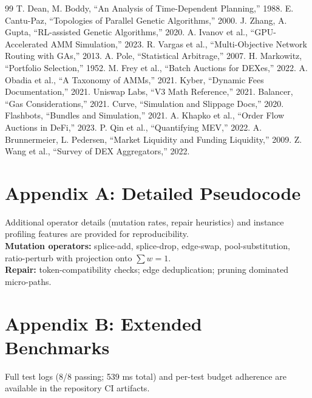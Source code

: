 \documentclass[11pt]{article}
\newcommand{\1}{\mathbf{1}}  %
\begin{document}
\begin{thebibliography}{99}
 T. Dean, M. Boddy, ``An Analysis of Time-Dependent Planning,'' 1988.
 E. Cantu-Paz, ``Topologies of Parallel Genetic Algorithms,'' 2000.
 J. Zhang, A. Gupta, ``RL-assisted Genetic Algorithms,'' 2020.
 A. Ivanov et al., ``GPU-Accelerated AMM Simulation,'' 2023.
 R. Vargas et al., ``Multi-Objective Network Routing with GAs,'' 2013.
 A. Pole, ``Statistical Arbitrage,'' 2007.
 H. Markowitz, ``Portfolio Selection,'' 1952.
 M. Frey et al., ``Batch Auctions for DEXes,'' 2022.
 A. Obadia et al., ``A Taxonomy of AMMs,'' 2021.
 Kyber, ``Dynamic Fees Documentation,'' 2021.
 Uniswap Labs, ``V3 Math Reference,'' 2021.
 Balancer, ``Gas Considerations,'' 2021.
 Curve, ``Simulation and Slippage Docs,'' 2020.
 Flashbots, ``Bundles and Simulation,'' 2021.
 A. Khapko et al., ``Order Flow Auctions in DeFi,'' 2023.
 P. Qin et al., ``Quantifying MEV,'' 2022.
 A. Brunnermeier, L. Pedersen, ``Market Liquidity and Funding Liquidity,'' 2009.
 Z. Wang et al., ``Survey of DEX Aggregators,'' 2022.
\end{thebibliography}

\appendix
\section*{Appendix A: Detailed Pseudocode}
\noindent Additional operator details (mutation rates, repair heuristics) and instance profiling features are provided for reproducibility.\\
\textbf{Mutation operators:} splice-add, splice-drop, edge-swap, pool-substitution, ratio-perturb with projection onto $\sum w=1$.\\
\textbf{Repair:} token-compatibility checks; edge deduplication; pruning dominated micro-paths.

\section*{Appendix B: Extended Benchmarks}
\noindent Full test logs (8/8 passing; 539 ms total) and per-test budget adherence are available in the repository CI artifacts.
\end{document}
